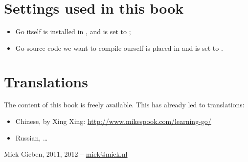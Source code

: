 \section*{Settings used in this book}
\begin{itemize}
\item Go itself is installed in , and  is set to  ;
\item Go source code we want to compile ourself is placed in  and
 is set to  .
\end{itemize}

\section*{Translations}
The content of this book is freely available. This has already led to translations:
\begin{itemize}
\item Chinese, by Xing Xing: \url{http://www.mikespook.com/learning-go/}
\item Russian, \ldots
\end{itemize}

\begin{flushright}
Miek Gieben, 2011, 2012 -- \url{miek@miek.nl}
\end{flushright}
